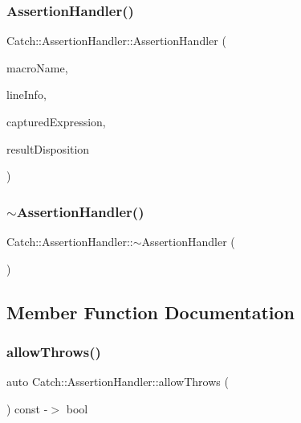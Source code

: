 \subsubsection{\texorpdfstring{Assertion\+Handler()}{AssertionHandler()}}
{\footnotesize\ttfamily Catch\+::\+Assertion\+Handler\+::\+Assertion\+Handler (\begin{DoxyParamCaption}\item[{\mbox{\hyperlink{classCatch_1_1StringRef}{String\+Ref}}}]{macro\+Name,  }\item[{\mbox{\hyperlink{structCatch_1_1SourceLineInfo}{Source\+Line\+Info}} const \&}]{line\+Info,  }\item[{\mbox{\hyperlink{classCatch_1_1StringRef}{String\+Ref}}}]{captured\+Expression,  }\item[{\mbox{\hyperlink{structCatch_1_1ResultDisposition_a3396cad6e2259af326b3aae93e23e9d8}{Result\+Disposition\+::\+Flags}}}]{result\+Disposition }\end{DoxyParamCaption})}

\mbox{\label{classCatch_1_1AssertionHandler_a1e839d810f6ac0fa6d127fe8350175ed}} 
\subsubsection{\texorpdfstring{$\sim$\+Assertion\+Handler()}{~AssertionHandler()}}
{\footnotesize\ttfamily Catch\+::\+Assertion\+Handler\+::$\sim$\+Assertion\+Handler (\begin{DoxyParamCaption}{ }\end{DoxyParamCaption})}



\subsection{Member Function Documentation}
\mbox{\label{classCatch_1_1AssertionHandler_a193bb3999494c46457f3059184c6b251}} 
\subsubsection{\texorpdfstring{allow\+Throws()}{allowThrows()}}
{\footnotesize\ttfamily auto Catch\+::\+Assertion\+Handler\+::allow\+Throws (\begin{DoxyParamCaption}{ }\end{DoxyParamCaption}) const -\/$>$  bool}

